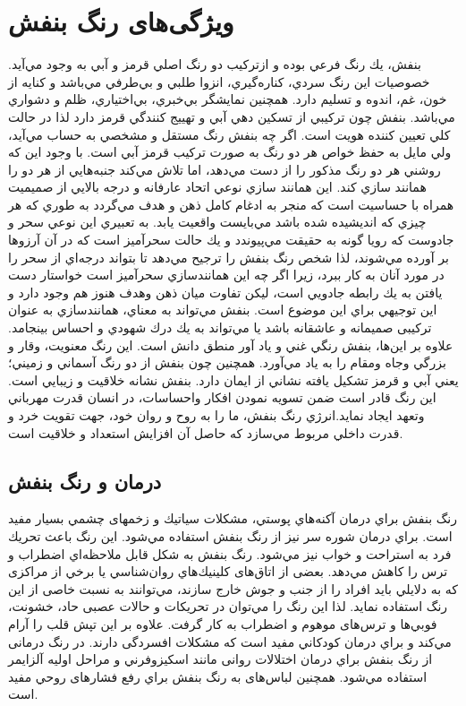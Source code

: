 \documentclass[12pt]{report}
\begin{document}
\section{ویژگی‌های رنگ بنفش}
بنفش، يك رنگ فرعي بوده و ازتركيب دو رنگ اصلي قرمز و آبي به وجود مي‌آيد. خصوصيات اين رنگ سردي، كناره‌گيري، انزوا طلبي و بي‌طرفي مي‌باشد و كنايه از خون، غم، اندوه و تسليم دارد. همچنين نمايشگر بي‌خبري، بي‌اختياري، ظلم و دشواري مي‌باشد. بنفش چون تركيبي از تسكين دهي آبي و تهييج كنندگي قرمز دارد لذا در حالت كلي تعيين كننده هويت است. اگر چه بنفش رنگ مستقل و مشخصي به حساب مي‌آيد، ولي مايل به حفظ خواص هر دو رنگ به صورت تركيب قرمز آبي است. با وجود اين كه روشني هر دو رنگ مذکور را از دست مي‌دهد، اما تلاش مي‌كند جنبه‌هايي از هر دو را همانند سازي كند. اين همانند سازي نوعي اتحاد عارفانه و درجه بالايي از صميميت همراه با حساسيت است كه منجر به ادغام كامل ذهن و هدف مي‌گردد به طوري كه هر چيزي كه انديشيده شده باشد مي‌بايست واقعيت يابد. به تعبيري اين نوعي سحر و جادوست كه رويا گونه به حقيقت مي‌پيوندد و يك حالت سحرآميز است كه در آن آرزوها بر آورده مي‌شوند، لذا شخص رنگ بنفش را ترجيح مي‌دهد تا بتواند درجه‌اي از سحر را در مورد آنان به كار ببرد، زيرا اگر چه اين همانندسازي سحرآميز است خواستار دست يافتن به يك رابطه جادويي است، ليكن تفاوت ميان ذهن وهدف هنوز هم وجود دارد و اين توجيهي براي اين موضوع است. بنفش مي‌تواند به معناي، همانندسازي به عنوان تركيبی صميمانه و عاشقانه باشد يا مي‌تواند به يك درك شهودي و احساس بينجامد.
علاوه بر اين‌ها، بنفش رنگي غني و ياد آور منطق دانش است. اين رنگ معنويت، وقار و بزرگي وجاه ومقام را به ياد مي‌آورد.
همچنين چون بنفش از دو رنگ آسماني و زميني؛ يعني آبي و قرمز تشكيل يافته نشاني از ايمان دارد.
بنفش نشانه خلاقيت و زيبايي است. اين رنگ قادر است ضمن تسويه نمودن افكار واحساسات، در انسان قدرت مهرباني وتعهد ايجاد نمايد.انرژي رنگ بنفش، ما را به روح و روان خود، جهت تقويت خرد و قدرت داخلي مربوط مي‌سازد كه حاصل آن افزايش استعداد و خلاقيت است.

\subsection{درمان و رنگ بنفش }
رنگ بنفش براي درمان آكنه‌هاي پوستي، مشکلات سياتيك و زخمهای چشمي  بسیار مفید است. براي درمان شوره سر نيز از رنگ بنفش استفاده مي‌شود. این رنگ باعث تحريك فرد به استراحت و خواب نيز مي‌شود.
رنگ بنفش به شکل قابل ملاحظه‌اي اضطراب و ترس را کاهش مي‌دهد. بعضی از اتاق‌های كلينيك‌هاي روان‌شناسي يا برخي از مراکزی كه به دلايلي باید افراد را از جنب و جوش خارج سازند، مي‌توانند به نسبت خاصی از اين رنگ استفاده نماید. لذا اين رنگ را مي‌توان در تحريكات و حالات عصبی حاد، خشونت، فوبي‌ها و ترس‌های موهوم و اضطراب به كار گرفت. علاوه بر اين تپش قلب را آرام مي‌كند و براي درمان كودكاني مفید است كه مشکلات افسردگی دارند. در رنگ درمانی  از رنگ بنفش براي درمان اختلالات روانی مانند اسكيزوفرني و مراحل اوليه آلزایمر استفاده مي‌شود. همچنین لباس‌های به رنگ بنفش براي رفع فشارهای روحي مفید است.
\end{document}
